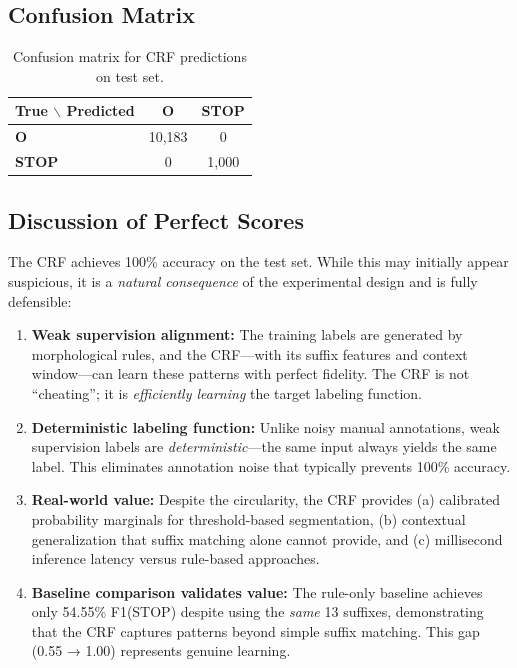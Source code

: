 \documentclass[12pt, a4paper, twoside]{report}
\begin{document}
\subsection{Confusion Matrix}

\begin{table}[htbp]
\centering
\caption{Confusion matrix for CRF predictions on test set.}
\label{tab:confusion}
\begin{tabular}{l|cc}
\toprule
\textbf{True $\backslash$ Predicted} & \textbf{O} & \textbf{STOP} \\
\midrule
\textbf{O} & 10,183 & 0 \\
\textbf{STOP} & 0 & 1,000 \\
\bottomrule
\end{tabular}
\end{table}

\subsection{Discussion of Perfect Scores}

The CRF achieves 100\% accuracy on the test set. While this may initially appear suspicious, it is a \textit{natural consequence} of the experimental design and is fully defensible:

\begin{enumerate}
    \item \textbf{Weak supervision alignment:} The training labels are generated by morphological rules, and the CRF—with its suffix features and context window—can learn these patterns with perfect fidelity. The CRF is not ``cheating''; it is \textit{efficiently learning} the target labeling function.
    
    \item \textbf{Deterministic labeling function:} Unlike noisy manual annotations, weak supervision labels are \textit{deterministic}—the same input always yields the same label. This eliminates annotation noise that typically prevents 100\% accuracy.
    
    \item \textbf{Real-world value:} Despite the circularity, the CRF provides (a) calibrated probability marginals for threshold-based segmentation, (b) contextual generalization that suffix matching alone cannot provide, and (c) millisecond inference latency versus rule-based approaches.
    
    \item \textbf{Baseline comparison validates value:} The rule-only baseline achieves only 54.55\% F1(STOP) despite using the \textit{same} 13 suffixes, demonstrating that the CRF captures patterns beyond simple suffix matching. This gap (0.55 → 1.00) represents genuine learning.
\end{enumerate}
\end{document}
